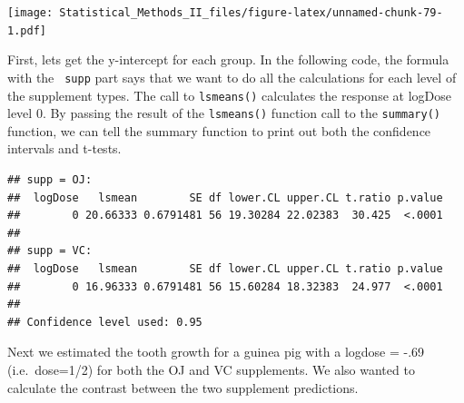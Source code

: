 \documentclass[]{book}
\newenvironment{Shaded}{\begin{snugshade}}{\end{snugshade}}
\newcommand{\KeywordTok}[1]{\textcolor[rgb]{0.13,0.29,0.53}{\textbf{{#1}}}}
\newcommand{\DataTypeTok}[1]{\textcolor[rgb]{0.13,0.29,0.53}{{#1}}}
\newcommand{\DecValTok}[1]{\textcolor[rgb]{0.00,0.00,0.81}{{#1}}}
\newcommand{\StringTok}[1]{\textcolor[rgb]{0.31,0.60,0.02}{{#1}}}
\newcommand{\OtherTok}[1]{\textcolor[rgb]{0.56,0.35,0.01}{{#1}}}
\newcommand{\NormalTok}[1]{{#1}}
\theoremstyle{definition}
\theoremstyle{definition}
\theoremstyle{remark}
\begin{document}
\texttt{[image: Statistical\_Methods\_II\_files/figure-latex/unnamed-chunk-79-1.pdf]}

First, lets get the y-intercept for each group. In the following code,
the formula with the \texttt{\textbar{}\ supp} part says that we want to
do all the calculations for each level of the supplement types. The call
to \texttt{lsmeans()} calculates the response at logDose level 0. By
passing the result of the \texttt{lsmeans()} function call to the
\texttt{summary()} function, we can tell the summary function to print
out both the confidence intervals and t-tests.

\begin{Shaded}
\end{Shaded}

\begin{verbatim}
## supp = OJ:
##  logDose   lsmean        SE df lower.CL upper.CL t.ratio p.value
##        0 20.66333 0.6791481 56 19.30284 22.02383  30.425  <.0001
## 
## supp = VC:
##  logDose   lsmean        SE df lower.CL upper.CL t.ratio p.value
##        0 16.96333 0.6791481 56 15.60284 18.32383  24.977  <.0001
## 
## Confidence level used: 0.95
\end{verbatim}

Next we estimated the tooth growth for a guinea pig with a logdose =
-.69 (i.e.~dose=1/2) for both the OJ and VC supplements. We also wanted
to calculate the contrast between the two supplement predictions.

\begin{Shaded}
\end{Shaded}
\end{document}
